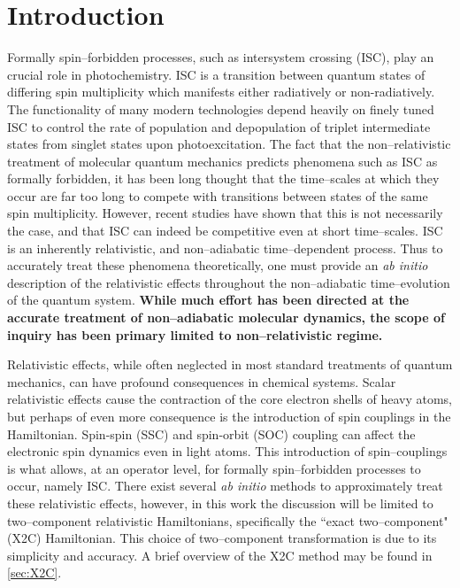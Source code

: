 \section{Introduction}

Formally spin--forbidden processes, such as intersystem crossing (ISC),  play
an crucial role in photochemistry. ISC is a transition between quantum states
of differing spin multiplicity which manifests either radiatively or
non-radiatively.  The functionality of many modern technologies depend heavily
on finely tuned ISC to control the rate of population and depopulation of
triplet intermediate states from singlet states upon photoexcitation. The fact
that the non--relativistic treatment of molecular quantum mechanics predicts
phenomena such as ISC as formally forbidden, it has been long thought that the
time--scales at which they occur are far too long to compete with transitions
between states of the same spin multiplicity. However, recent studies have
shown that this is not necessarily the case, and that ISC can indeed be
competitive even at short time--scales.  ISC is an inherently relativistic, and
non--adiabatic time--dependent process. Thus to accurately treat these phenomena
theoretically, one must provide an \emph{ab initio} description of the
relativistic effects throughout the non--adiabatic time--evolution of the
quantum system.  {\bf While much effort has been directed at the accurate
treatment of non--adiabatic molecular dynamics, the scope of inquiry has been
primary limited to non--relativistic regime.}

Relativistic effects, while often neglected in most standard treatments of
quantum mechanics, can have profound consequences in chemical
systems.\cite{Pyykko12_45} Scalar relativistic effects cause the contraction of
the core electron shells of heavy atoms, but perhaps of even more consequence is
the introduction of spin couplings in the Hamiltonian.  Spin-spin (SSC) and
spin-orbit (SOC) coupling can affect the electronic spin dynamics even in light
atoms. 
This introduction of spin--couplings is what allows, at an
operator level, for formally spin--forbidden processes to occur, namely
ISC. 
There exist several \emph{ab
initio} methods to approximately treat these relativistic effects, however, in
this work the discussion will be limited to two--component relativistic
Hamiltonians, specifically the ``exact two--component" (X2C) Hamiltonian. This
choice of two--component transformation is due to its simplicity and accuracy.
A brief overview of the X2C method may be found in \cref{sec:X2C}.

